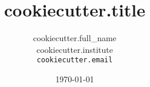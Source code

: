 \documentclass[conference]{article}
\author{
    {{ cookiecutter.full_name }}\\
    {{ cookiecutter.institute }}\\
    \texttt{ {{ cookiecutter.email }} }
}
\title{ {{ cookiecutter.title }} }
\date{\today}
\begin{document}
\maketitle









\balance

\end{document}
